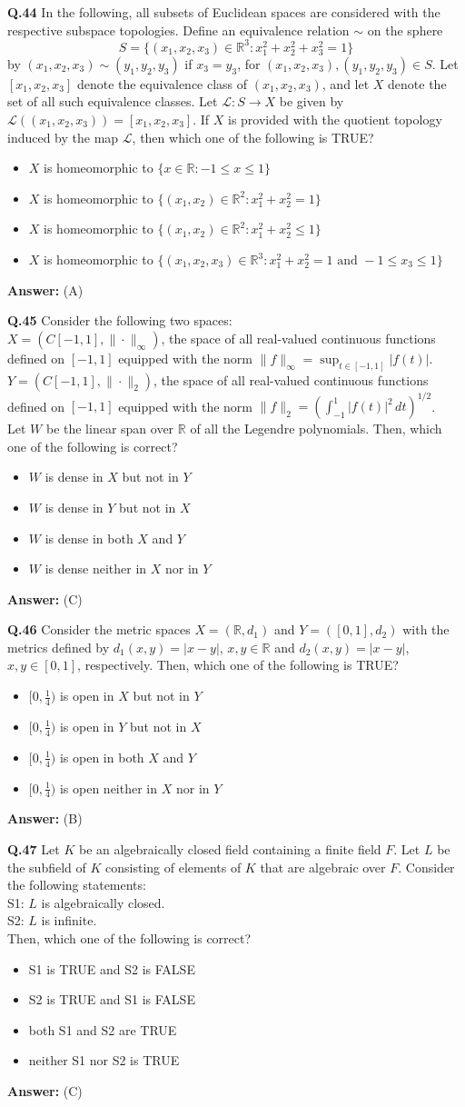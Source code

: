 \documentclass[11pt,a4paper]{article}
\newcommand{\optslistA}[4]{%
  \begin{itemize}
    \setlength{\itemsep}{2pt}\setlength{\parskip}{0pt}
    \item[(A)] #1
    \item[(B)] #2
    \item[(C)] #3
    \item[(D)] #4
  \end{itemize}%
}
\newcommand{\ans}[1]{\textbf{Answer:} #1\par\medskip}
\begin{document}
\textbf{Q.44} In the following, all subsets of Euclidean spaces are considered with the respective subspace topologies. Define an equivalence relation $\sim$ on the sphere
\[
  S = \{(x_1, x_2, x_3) \in \mathbb{R}^3 : x_1^2 + x_2^2 + x_3^2 = 1\}
\]
by $(x_1, x_2, x_3) \sim (y_1, y_2, y_3)$ if $x_3 = y_3$, for $(x_1, x_2, x_3), (y_1, y_2, y_3) \in S$. Let $[x_1, x_2, x_3]$ denote the equivalence class of $(x_1, x_2, x_3)$, and let $X$ denote the set of all such equivalence classes. Let $\mathcal{L} : S \to X$ be given by $\mathcal{L}((x_1, x_2, x_3)) = [x_1, x_2, x_3]$. If $X$ is provided with the quotient topology induced by the map $\mathcal{L}$, then which one of the following is TRUE?
\optslistA{$X$ is homeomorphic to $\{x \in \mathbb{R} : -1 \le x \le 1\}$}{$X$ is homeomorphic to $\{(x_1, x_2) \in \mathbb{R}^2 : x_1^2 + x_2^2 = 1\}$}{$X$ is homeomorphic to $\{(x_1, x_2) \in \mathbb{R}^2 : x_1^2 + x_2^2 \le 1\}$}{$X$ is homeomorphic to $\{(x_1, x_2, x_3) \in \mathbb{R}^3 : x_1^2 + x_2^2 = 1 \text{ and } -1 \le x_3 \le 1\}$}
\ans{(A)}

\textbf{Q.45} Consider the following two spaces:\\
$X = (C[-1, 1], \|\cdot\|_\infty)$, the space of all real-valued continuous functions defined on $[-1, 1]$ equipped with the norm $\|f\|_\infty = \sup_{t \in [-1, 1]} |f(t)|$.\\
$Y = (C[-1, 1], \|\cdot\|_2)$, the space of all real-valued continuous functions defined on $[-1, 1]$ equipped with the norm $\|f\|_2 = (\int_{-1}^{1} |f(t)|^2\,dt)^{1/2}$.\\
Let $W$ be the linear span over $\mathbb{R}$ of all the Legendre polynomials. Then, which one of the following is correct?
\optslistA{$W$ is dense in $X$ but not in $Y$}{$W$ is dense in $Y$ but not in $X$}{$W$ is dense in both $X$ and $Y$}{$W$ is dense neither in $X$ nor in $Y$}
\ans{(C)}

\textbf{Q.46} Consider the metric spaces $X = (\mathbb{R}, d_1)$ and $Y = ([0, 1], d_2)$ with the metrics defined by $d_1(x, y) = |x - y|$, $x, y \in \mathbb{R}$ and $d_2(x, y) = |x - y|$, $x, y \in [0, 1]$, respectively. Then, which one of the following is TRUE?
\optslistA{$[0, \frac{1}{4})$ is open in $X$ but not in $Y$}{$[0, \frac{1}{4})$ is open in $Y$ but not in $X$}{$[0, \frac{1}{4})$ is open in both $X$ and $Y$}{$[0, \frac{1}{4})$ is open neither in $X$ nor in $Y$}
\ans{(B)}

\textbf{Q.47} Let $K$ be an algebraically closed field containing a finite field $F$. Let $L$ be the subfield of $K$ consisting of elements of $K$ that are algebraic over $F$. Consider the following statements:\\
S1: $L$ is algebraically closed.\\
S2: $L$ is infinite.\\
Then, which one of the following is correct?
\optslistA{S1 is TRUE and S2 is FALSE}{S2 is TRUE and S1 is FALSE}{both S1 and S2 are TRUE}{neither S1 nor S2 is TRUE}
\ans{(C)}
\end{document}
